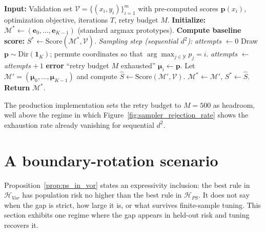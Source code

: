 \begin{algorithm}[H]
\caption{VoronoiTuning via sequential $d^2$ sampling}\label{alg:voronoi_tuning}
\begin{algorithmic}[1]
\State \textbf{Input:} Validation set $\mathcal{V}=\{(x_i, y_i)\}_{i=1}^m$ with pre-computed scores $\hat{\mathbf{p}}(x_i)$, optimization objective, iterations $T$, retry budget $M$.
\State \textbf{Initialize:} $\mathcal{M}^* \leftarrow (\mathbf{e}_0, \dots, \mathbf{e}_{K-1})$ (standard argmax prototypes).
\State \textbf{Compute baseline score:} $S^* \leftarrow \text{Score}(\mathcal{M}^*, \mathcal{V})$.
    \State \textit{Sampling step (sequential $d^2$):}
        \State \textit{attempts} $\leftarrow 0$
        \Repeat
            \State Draw $\mathbf{p} \sim \mathrm{Dir}(\mathbf{1}_K)$; permute coordinates so that $\arg\max_{j \in \mathcal{Y}} p_j = i$.
            \State \textit{attempts} $\leftarrow$ \textit{attempts} $+\,1$
            \State \textbf{error} ``retry budget $M$ exhausted''
        \EndIf
        \State $\boldsymbol{\mu}_i \leftarrow \mathbf{p}$.
    \EndFor
    \State Let $\mathcal{M}' = (\boldsymbol{\mu}_0, \ldots, \boldsymbol{\mu}_{K-1})$ and compute $\hat{S} \leftarrow \text{Score}(\mathcal{M}', \mathcal{V})$.
        \State $\mathcal{M}^* \leftarrow \mathcal{M}'$, \quad $S^* \leftarrow \hat{S}$.
    \EndIf
\EndFor
\State \textbf{Return} $\mathcal{M}^*$.
\end{algorithmic}
\end{algorithm}

The production implementation sets the retry budget to $M = 500$ as headroom, well above the regime in which Figure~\ref{fig:sampler_rejection_rate} shows the exhaustion rate already vanishing for sequential $d^2$.

\section{A boundary-rotation scenario}\label{sec:boundary_rotation_experiment}

Proposition~\ref{prop:ps_in_vor} states an expressivity inclusion: the best rule in $\mathcal{H}_{Vor}$ has population risk no higher than the best rule in $\mathcal{H}_{PS}$. It does not say when the gap is strict, how large it is, or what survives finite-sample tuning. This section exhibits one regime where the gap appears in held-out risk and tuning recovers it.

